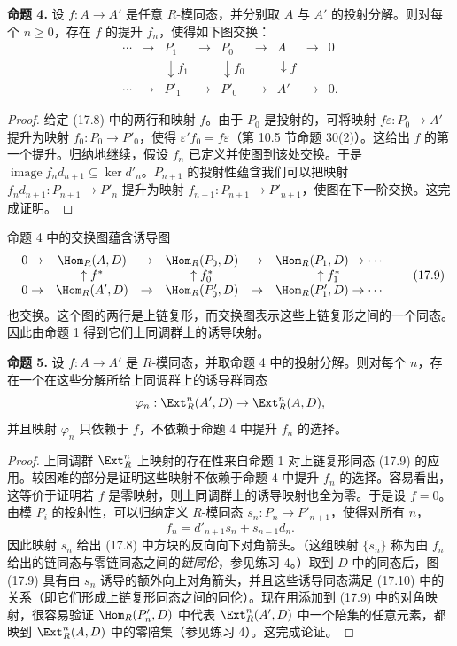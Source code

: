 \medskip
\noindent\textbf{命题 4.} 设 $f:A\to A'$ 是任意 $R$-模同态，并分别取 $A$ 与 $A'$ 的投射分解。则对每个 $n\geq0$，存在 $f$ 的提升 $f_n$，使得如下图交换：
\[
\begin{array}{ccccccccc}
\cdots&\to&P_1&\to&P_0&\to&A&\to&0\\
&&\downarrow f_1&&\downarrow f_0&&\downarrow f&&\\
\cdots&\to&P'_1&\to&P'_0&\to&A'&\to&0 .
\end{array}
\tag{17.8}
\]

\begin{proof}
给定 (17.8) 中的两行和映射 $f$。由于 $P_0$ 是投射的，可将映射 $f\varepsilon:P_0\to A'$ 提升为映射 $f_0:P_0\to P'_0$，使得 $\varepsilon'f_0=f\varepsilon$（第 10.5 节命题 30(2)）。这给出 $f$ 的第一个提升。归纳地继续，假设 $f_n$ 已定义并使图到该处交换。于是 $\operatorname{image} f_nd_{n+1}\subseteq\ker d'_n$。$P_{n+1}$ 的投射性蕴含我们可以把映射 $f_nd_{n+1}:P_{n+1}\to P'_n$ 提升为映射 $f_{n+1}:P_{n+1}\to P'_{n+1}$，使图在下一阶交换。这完成证明。
\end{proof}

命题 4 中的交换图蕴含诱导图
\[
\begin{array}{cccccc}
0\to&\Hom_R(A,D)&\to&\Hom_R(P_0,D)&\to&\Hom_R(P_1,D)\to\cdots\\
&\uparrow f^*&&\uparrow f_0^*&&\uparrow f_1^*\\
0\to&\Hom_R(A',D)&\to&\Hom_R(P'_0,D)&\to&\Hom_R(P'_1,D)\to\cdots
\end{array}
\tag{17.9}
\]
也交换。这个图的两行是上链复形，而交换图表示这些上链复形之间的一个同态。因此由命题 1 得到它们上同调群上的诱导映射。

\medskip
\noindent\textbf{命题 5.} 设 $f:A\to A'$ 是 $R$-模同态，并取命题 4 中的投射分解。则对每个 $n$，存在一个在这些分解所给上同调群上的诱导群同态
\[
  \varphi_n:\Ext_R^n(A',D)\to\Ext_R^n(A,D),
\]
并且映射 $\varphi_n$ 只依赖于 $f$，不依赖于命题 4 中提升 $f_n$ 的选择。

\begin{proof}
上同调群 $\Ext_R^n$ 上映射的存在性来自命题 1 对上链复形同态 (17.9) 的应用。较困难的部分是证明这些映射不依赖于命题 4 中提升 $f_n$ 的选择。容易看出，这等价于证明若 $f$ 是零映射，则上同调群上的诱导映射也全为零。于是设 $f=0$。由模 $P_i$ 的投射性，可以归纳定义 $R$-模同态 $s_n:P_n\to P'_{n+1}$，使得对所有 $n$，
\[
  f_n=d'_{n+1}s_n+s_{n-1}d_n .
  \tag{17.10}
\]
因此映射 $s_n$ 给出 (17.8) 中方块的反向向下对角箭头。（这组映射 $\{s_n\}$ 称为由 $f_n$ 给出的链同态与零链同态之间的\emph{链同伦}，参见练习 4。）取到 $D$ 中的同态后，图 (17.9) 具有由 $s_n$ 诱导的额外向上对角箭头，并且这些诱导同态满足 (17.10) 中的关系（即它们形成上链复形同态之间的同伦）。现在用添加到 (17.9) 中的对角映射，很容易验证 $\Hom_R(P'_n,D)$ 中代表 $\Ext_R^n(A',D)$ 中一个陪集的任意元素，都映到 $\Ext_R^n(A,D)$ 中的零陪集（参见练习 4）。这完成论证。
\end{proof}

